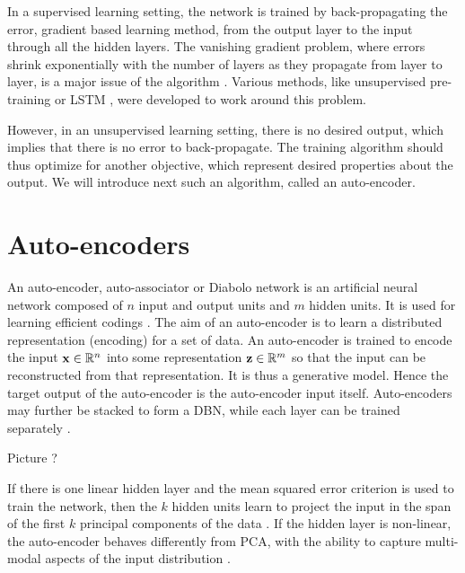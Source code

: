 In a supervised learning setting, the network is trained by back-propagating the error, gradient based learning method, from the output layer to the input through all the hidden layers.
The vanishing gradient problem, where errors shrink exponentially with the number of layers as they propagate from layer to layer, is a major issue of the algorithm \cite{hochreiter2001vanishingGradient}. Various methods, like unsupervised pre-training or \gls{LSTM} \cite{hochreiter1997LSTM}, were developed to work around this problem.

However, in an unsupervised learning setting, there is no desired output, which implies that there is no error to back-propagate. The training algorithm should thus optimize for another objective, which represent desired properties about the output. We will introduce next such an algorithm, called an auto-encoder.

\section{Auto-encoders} \label{sec:auto_encoders}

An auto-encoder, auto-associator or Diabolo network is an artificial neural network composed of $n$ input and output units and $m$ hidden units. It is used for learning efficient codings \cite{bourlard1988autoencoder, hinton1994autoencoder}. The aim of an auto-encoder is to learn a distributed representation (encoding) for a set of data. An auto-encoder is trained to encode the input $\mathbf{x} \in \mathbb{R}^n$ into some representation $\mathbf{z} \in \mathbb{R}^m$ so that the input can be reconstructed from that representation. It is thus a generative model. Hence the target output of the auto-encoder is the auto-encoder input itself. Auto-encoders may further be stacked to form a \gls{DBN}, while each layer can be trained separately \cite{bengio2007DBN, lecun2006stackedSparseAutoencoders}.

{\color{red} Picture ?}

If there is one linear hidden layer and the mean squared error criterion is used to train the network, then the $k$ hidden units learn to project the input in the span of the first $k$ principal components of the data \cite{bourlard1988autoencoder}. If the hidden layer is non-linear, the auto-encoder behaves differently from PCA, with the ability to capture multi-modal aspects of the input distribution \cite{japkowicz2000autoencoderPCA}.

